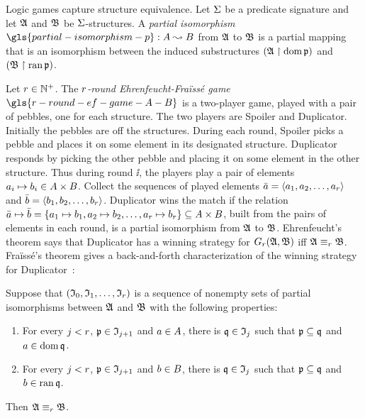 Logic games capture structure equivalence.
Let $\mathrm{\Sigma}$ be a predicate signature and let $\mathfrak{A}$ and $\mathfrak{B}$ be
$\mathrm{\Sigma}$-structures.
A \emph{partial isomorphism} $\gls{partial-isomorphism-p} : \domA \pto \domB$
from $\mathfrak{A}$ to $\mathfrak{B}$ is a partial mapping that is an isomorphism between the 
induced substructures $(\mathfrak{A} \restriction \operatorname{dom} \mathfrak{p})$ and 
$(\mathfrak{B} \restriction \operatorname{ran} \mathfrak{p})$.

Let $r \in \mathbb{N}^{+}$.
The \emph{$r$-round Ehrenfeucht-Fra\"{i}ss\'{e} game}
$\gls{r-round-ef-game-A-B}$ is a two-player game, played with a pair of pebbles,
one for each structure. The two players are Spoiler and Duplicator.
Initially the pebbles are off the structures.
During each round, Spoiler picks a pebble
and places it on some element in its designated structure.
Duplicator responds by picking the other pebble and placing it on some
element in the other structure. Thus during round $\ii$, the players play a pair
of elements $a_{i} \mapsto b_{i} \in A \times B$. 
Collect the sequences of played elements $\bar{a} = \left\langle a_{1}, a_{2}, \dots,
a_{r} \right\rangle$ and $\bar{b} = \left\langle b_{1}, b_{2}, \dots, b_{r} \right\rangle$.
Duplicator wins the match if the
relation $\bar{a} \mapsto \bar{b} = \left\{a_{1} \mapsto b_{1}, a_{2} \mapsto
b_{2}, \dots, a_{r} \mapsto b_{r}\right\} \subseteq A \times B$, built from
the pairs of elements in each round, is a partial isomorphism from $\mathfrak{A}$ to
$\mathfrak{B}$.
Ehrenfeucht's theorem says that Duplicator has a winning strategy for
$G_{r}(\mathfrak{A},\mathfrak{B})$ iff $\mathfrak{A} \equiv_{r} \mathfrak{B}$.
Fra\"{i}ss\'{e}'s theorem gives a back-and-forth characterization of the winning
strategy for Duplicator~\cite[ch. 2]{ebbinghaus1999finite}:
\begin{theorem}\label{thm:game-ef}
Suppose that $(\mathfrak{I}_{0}, \mathfrak{I}_{1}, \dots, \mathfrak{I}_{r})$ is a sequence of nonempty
sets of partial isomorphisms between $\mathfrak{A}$ and $\mathfrak{B}$ with the following
properties:
\begin{enumerate}
  \item For every $j < r$, $\mathfrak{p} \in \mathfrak{I}_{j+1}$ and $a \in A$,
  there is $\mathfrak{q} \in \mathfrak{I}_{j}$ such that $\mathfrak{p} \subseteq \mathfrak{q}$ and
  $a \in \operatorname{dom}\mathfrak{q}$.
  \item For every $j < r$, $\mathfrak{p} \in \mathfrak{I}_{j+1}$ and $b \in B$,
  there is $\mathfrak{q} \in \mathfrak{I}_{j}$ such that $\mathfrak{p} \subseteq \mathfrak{q}$ and 
  $b \in \operatorname{ran}\mathfrak{q}$.
\end{enumerate}
Then $\mathfrak{A} \equiv_{r} \mathfrak{B}$.
\end{theorem}

